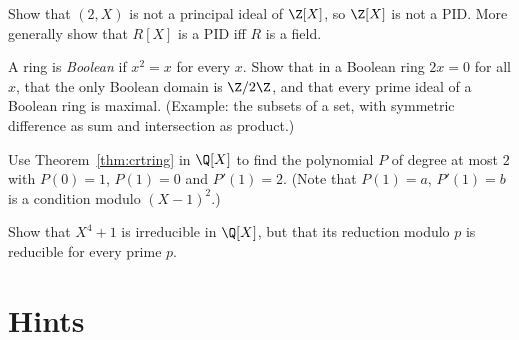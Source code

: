 \begin{exercise}[$\star\star$]\label{ex:zxnotpid}
Show that $(2,X)$ is not a principal ideal of $\Z[X]$, so $\Z[X]$ is not a PID. More generally show that $R[X]$ is a PID iff $R$ is a field.
\end{exercise}

\begin{exercise}[$\star\star$]\label{ex:boolean}
A ring is \emph{Boolean} if $x^2=x$ for every $x$. Show that in a Boolean ring $2x=0$ for all $x$, that the only Boolean domain is $\Z/2\Z$, and that every prime ideal of a Boolean ring is maximal. (Example: the subsets of a set, with symmetric difference as sum and intersection as product.)
\end{exercise}

\begin{exercise}[$\star\star$]\label{ex:crtinterp}
Use Theorem~\ref{thm:crtring} in $\Q[X]$ to find the polynomial $P$ of degree at most $2$ with $P(0)=1$, $P(1)=0$ and $P'(1)=2$. (Note that $P(1)=a$, $P'(1)=b$ is a condition modulo $(X-1)^2$.)
\end{exercise}

\begin{exercise}[$\star\star\star$]\label{ex:x4p1}
Show that $X^4+1$ is irreducible in $\Q[X]$, but that its reduction modulo $p$ is reducible for every prime $p$.
\end{exercise}

\section{Hints}

